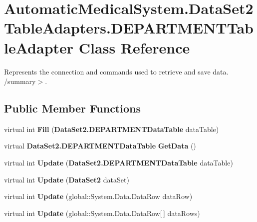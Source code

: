 \section{AutomaticMedicalSystem.DataSet2TableAdapters.DEPARTMENTTableAdapter Class Reference}
\label{class_automatic_medical_system_1_1_data_set2_table_adapters_1_1_d_e_p_a_r_t_m_e_n_t_table_adapter}
Represents the connection and commands used to retrieve and save data. /summary$>$.  


\subsection*{Public Member Functions}
\begin{CompactItemize}
\item 
virtual int \textbf{Fill} ({\bf DataSet2.DEPARTMENTDataTable} dataTable)\label{class_automatic_medical_system_1_1_data_set2_table_adapters_1_1_d_e_p_a_r_t_m_e_n_t_table_adapter_89ef42bdb9f2058520aa5229a9d05b0f}

\item 
virtual {\bf DataSet2.DEPARTMENTDataTable} \textbf{GetData} ()\label{class_automatic_medical_system_1_1_data_set2_table_adapters_1_1_d_e_p_a_r_t_m_e_n_t_table_adapter_6aa19dfea942c3200f13ea5a16256f8b}

\item 
virtual int \textbf{Update} ({\bf DataSet2.DEPARTMENTDataTable} dataTable)\label{class_automatic_medical_system_1_1_data_set2_table_adapters_1_1_d_e_p_a_r_t_m_e_n_t_table_adapter_97bdd4705dffcafa889e3a64fbd8f5bd}

\item 
virtual int \textbf{Update} ({\bf DataSet2} dataSet)\label{class_automatic_medical_system_1_1_data_set2_table_adapters_1_1_d_e_p_a_r_t_m_e_n_t_table_adapter_c93dc7989e95678c8b16ea00516d59b6}

\item 
virtual int \textbf{Update} (global::System.Data.DataRow dataRow)\label{class_automatic_medical_system_1_1_data_set2_table_adapters_1_1_d_e_p_a_r_t_m_e_n_t_table_adapter_f689d98a93366aad4ce4be5bce40d1d2}

\item 
virtual int \textbf{Update} (global::System.Data.DataRow[$\,$] dataRows)\label{class_automatic_medical_system_1_1_data_set2_table_adapters_1_1_d_e_p_a_r_t_m_e_n_t_table_adapter_a9216c8854cec3f254166b7ab3a0d45b}


\end{CompactItemize}
